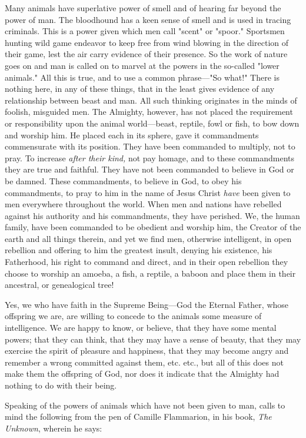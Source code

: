 Many animals have superlative power of smell and of hearing far beyond the power of man.
The bloodhound has a keen sense of smell and is used in tracing criminals. This is a power
given which men call "scent" or "spoor." Sportsmen hunting wild game endeavor to keep free
from wind blowing in the direction of their game, lest the air carry evidence of their
presence. So the work of nature goes on and man is called on to marvel at the powers in the
so-called "lower animals." All this is true, and to use a common phrase—"So what!" There is
nothing here, in any of these things, that in the least gives evidence of any relationship
between beast and man. All such thinking originates in the minds of foolish, misguided men.
The Almighty, however, has not placed the requirement or responsibility upon the animal
world—beast, reptile, fowl or fish, to bow down and worship him. He placed each in its
sphere, gave it commandments commensurate with its position. They have been commanded
to multiply, not to pray. To increase \textit{after their kind,} not pay homage, and to these
commandments they are true and faithful. They have not been commanded to believe in God
or be damned. These commandments, to believe in God, to obey his commandments, to pray
to him in the name of Jesus Christ \textit{have} been given to men everywhere throughout the world.
When men and nations have rebelled against his authority and his commandments, they have
perished. We, the human family, have been commanded to be obedient and worship him, the
Creator of the earth and all things therein, and yet we find men, otherwise intelligent, in open
rebellion and offering to him the greatest insult, denying his existence, his Fatherhood, his
right to command and direct, and in their open rebellion they choose to worship an amoeba, a
fish, a reptile, a baboon and place them in their ancestral, or genealogical tree!

Yes, we who have faith in the Supreme Being—God the Eternal Father, whose offspring we
are, are willing to concede to the animals some measure of intelligence. We are happy to
know, or believe, that they have some mental powers; that they can think, that they may have
a sense of beauty, that they may exercise the spirit of pleasure and happiness, that they may
become angry and remember a wrong committed against them, etc. etc., but all of this does
not make them the offspring of God, nor does it indicate that the Almighty had nothing to do
with their being.

Speaking of the powers of animals which have not been given to man, calls to mind the
following from the pen of Camille Flammarion, in his book, \textit{The Unknown}, wherein he says:

